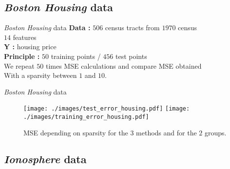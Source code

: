 \documentclass[unknownkeysallowed]{beamer}
\begin{document}
\subsection{\textit{Boston Housing} data}
\label{sub:Boston Housing data}

\begin{frame}{\textit{Boston Housing} data}
\textbf{Data : }$506$ census tracts from $1970$ census\\
\hspace{1.2cm}       $14$ features\\
\vspace{0.5cm}
\textbf{Y : }housing price\\
\vspace{0.5cm}
\textbf{Principle : }$50$ training points / $456$ test points\\
We repeat $50$ times MSE calculations and compare MSE obtained\\
With a sparsity between $1$ and $10$.
\end{frame}

\begin{frame}{\textit{Boston Housing} data}
\begin{figure}
    \centering
    \texttt{[image: ./images/test\_error\_housing.pdf]}
    \texttt{[image: ./images/training\_error\_housing.pdf]}
    \caption{MSE depending on sparsity for the $3$ methods and for the $2$ groups.}
\end{figure}
\end{frame}

\subsection{\textit{Ionosphere} data}
\label{sub:Ionosphere data}
\end{document}
